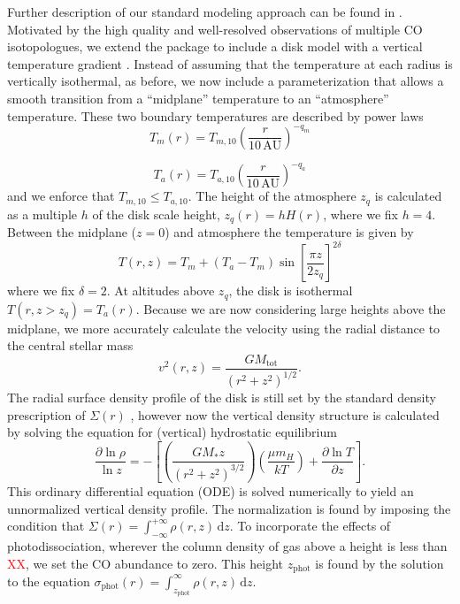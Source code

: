 \documentclass[twocolumn]{aastex6}
\newcommand{\todo}[1]{ \textcolor{red}{#1}}
\begin{document}
Further description of our standard modeling approach can be found in \citep{czekala15a,czekala16}. Motivated by the high quality and well-resolved observations of multiple CO isotopologues, we extend the package to include a disk model with a vertical temperature gradient \citep[e.g.,][]{dartois03}. Instead of assuming that the temperature at each radius is vertically isothermal, as before, we now include a parameterization \citep[following][]{rosenfeld13a,williams14} that allows a smooth transition from a ``midplane'' temperature to an ``atmosphere'' temperature. These two boundary temperatures are described by power laws
\begin{equation}
	T_m(r) = T_{m,10} \left ( \frac{r}{10\,\textrm{AU}} \right )^{-q_m}
\end{equation}

\begin{equation}
	T_a(r) = T_{a,10} \left ( \frac{r}{10\,\textrm{AU}} \right )^{-q_a}
\end{equation}
and we enforce that $T_{m,10} \leq T_{a,10}$. The height of the atmosphere $z_q$ is calculated as a multiple $h$ of the disk scale height, $z_q(r) = h H(r)$, where we fix $h = 4$. Between the midplane ($z$$=$$0$) and atmosphere the temperature is given by
\begin{equation}
	T(r, z) = T_m + (T_a - T_m)  \sin \left [ \frac{\pi z}{2 z_q} \right ]^{2 \delta}
\end{equation}
where we fix $\delta = 2$. At altitudes above $z_q$, the disk is isothermal $T(r, z > z_q) = T_a(r)$. Because we are now considering large heights above the midplane, we more accurately calculate the velocity using the radial distance to the central stellar mass
\begin{equation}
	v^2(r, z) = \frac{G M_\mathrm{tot}}{(r^2 + z^2)^{1/2}}.
\end{equation}
The radial surface density profile of the disk is still set by the standard density prescription of $\Sigma(r)$ \citep[see][]{czekala15a}, however now the vertical density structure is calculated by solving the equation for (vertical) hydrostatic equilibrium
\begin{equation}
	\frac{\partial \ln \rho}{\ln z} = - \left [\left (\frac{G M_\ast z}{(r^2 + z^2)^{3/2}} \right) \left ( \frac{\mu m_H}{k T} \right ) + \frac{\partial \ln T}{\partial z} \right].
\end{equation}
This ordinary differential equation (ODE) is solved numerically to yield an unnormalized vertical density profile. The normalization is found by imposing the condition that $\Sigma(r) = \int_{-\infty}^{+\infty} \rho(r, z)\, \mathrm{d}z$. To incorporate the effects of photodissociation, wherever the column density of gas above a height is less than \todo{XX}, we set the CO abundance to zero. This height $z_\mathrm{phot}$ is found by the solution to the equation $\sigma_\mathrm{phot}(r) = \int_{z_\mathrm{phot}}^\infty \rho(r, z)\, \mathrm{d}z.$
\end{document}
